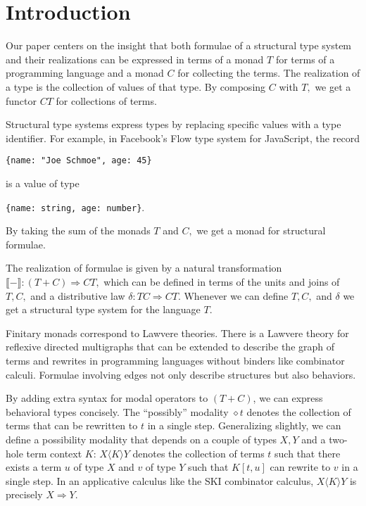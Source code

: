 \documentclass[sigplan,9pt,review,anonymous]{acmart}\settopmatter{printfolios=true,printccs=false,printacmref=false}
\newcommand{\maps}{\colon}
\newcommand{\interp}[1]{\llbracket #1 \rrbracket}
\begin{document}
\section{Introduction}

Our paper centers on the insight that both formulae of a structural type system and their realizations can be expressed in terms of a monad $T$ for terms of a programming language and a monad $C$ for collecting the terms.  The realization of a type is the collection of values of that type.  By composing $C$ with $T,$ we get a functor $CT$ for collections of terms.

Structural type systems express types by replacing specific values with a type identifier.  For example, in Facebook's Flow type system for JavaScript, the record
\begin{center}{\tt \{name: "Joe Schmoe", age: 45\}}\end{center}
is a value of type
\begin{center}{\tt \{name: string, age: number\}}.\end{center}
By taking the sum of the monads $T$ and $C,$ we get a monad for structural formulae.

The realization of formulae is given by a natural transformation ${\interp{-}\maps (T+C)\Rightarrow CT,}$ which can be defined in terms of the units and joins of $T, C,$ and a distributive law ${\delta\maps TC \Rightarrow CT.}$  Whenever we can define $T, C,$ and $\delta$ we get a structural type system for the language $T.$

Finitary monads correspond to Lawvere theories.  There is a Lawvere theory for reflexive directed multigraphs that can be extended to describe the graph of terms and rewrites in programming languages without binders like combinator calculi.  Formulae involving edges not only describe structures but also behaviors.

By adding extra syntax for modal operators to $(T+C)$, we can express behavioral types concisely.  The ``possibly'' modality $\diamond t$ denotes the collection of terms that can be rewritten to $t$ in a single step.  Generalizing slightly, we can define a possibility modality that depends on a couple of types $X, Y$ and a two-hole term context $K$: $X\langle K \rangle Y$ denotes the collection of terms $t$ such that there exists a term $u$ of type $X$ and $v$ of type $Y$ such that $K[t, u]$ can rewrite to $v$ in a single step.  In an applicative calculus like the SKI combinator calculus, $X\langle K \rangle Y$ is precisely $X \Rightarrow Y.$
\end{document}
